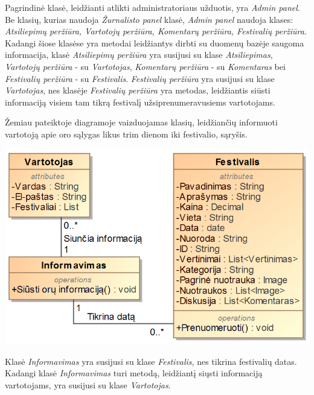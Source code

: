 ﻿\documentclass{VUMIFPSkursinis}
\begin{document}
Pagrindinė klasė, leidžianti atlikti administratoriaus užduotis, yra \textit{Admin panel}. Be klasių, kurias naudoja \textit{Žurnalisto panel} klasė, \textit{Admin panel} naudoja klases: \textit{Atsiliepimų peržiūra, Vartotojų peržiūra, Komentarų peržiūra, Festivalių peržiūra}. Kadangi šiose klasėse yra metodai leidžiantys dirbti su duomenų bazėje saugoma informacija, klasė \textit{Atsiliepimų peržiūra} yra susijusi su klase \textit{Atsiliepimas}, \textit{Vartotojų peržiūra} - su \textit{Vartotojas}, \textit{Komentarų peržiūra} - su \textit{Komentaras} bei \textit{Festivalių peržiūra} - su \textit{Festivalis}. \textit{Festivalių peržiūra} yra susijusi su klase \textit{Vartotojas}, nes klasėje \textit{Festivalių peržiūra} yra metodas, leidžiantis siūsti informaciją visiem tam tikrą festivalį užsiprenumeravusiems vartotojams.

Žemiau pateiktoje diagramoje vaizduojamas klasių, leidžiančių informuoti vartotoją apie oro sąlygas likus trim dienom iki festivalio, sąryšis.
\begin{center}
    \includegraphics[scale=0.5]{img/PSI3/orai.PNG}
\end{center}
Klasė \textit{Informavimas} yra susijusi su klase \textit{Festivalis}, nes tikrina festivalių datas. Kadangi klasė \textit{Informavimas} turi metodą, leidžiantį siųsti informaciją vartotojams, yra susijusi su klase \textit{Vartotojas}.
\end{document}

